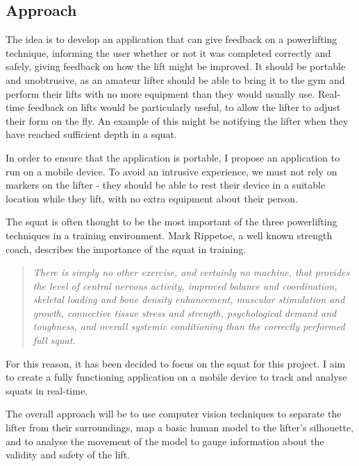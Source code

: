 \subsection{Approach}

The idea is to develop an application that can give feedback on a powerlifting technique, informing the user whether or not it was completed correctly and safely, giving feedback on how the lift might be improved. It should be portable and unobtrusive, as an amateur lifter should be able to bring it to the gym and perform their lifts with no more equipment than they would usually use. Real-time feedback on lifts would be particularly useful, to allow the lifter to adjust their form on the fly. An example of this might be notifying the lifter when they have reached sufficient depth in a squat.

In order to ensure that the application is portable, I propose an application to run on a mobile device. To avoid an intrusive experience, we must not rely on markers on the lifter - they should be able to rest their device in a suitable location while they lift, with no extra equipment about their person.

The squat is often thought to be the most important of the three powerlifting techniques in a training environment. Mark Rippetoe, a well known strength coach, describes the importance of the squat in training.

\begin{quote}
\emph{There is simply no other exercise, and certainly no machine, that provides the level of central nervous activity, improved balance and coordination, skeletal loading and bone density enhancement, muscular stimulation and growth, connective tissue stress and strength, psychological demand and toughness, and overall systemic conditioning than the correctly performed full squat.}
\end{quote}

For this reason, it has been decided to focus on the squat for this project. I aim to create a fully functioning application on a mobile device to track and analyse squats in real-time.

The overall approach will be to use computer vision techniques to separate the lifter from their surroundings, map a basic human model to the lifter's silhouette, and to analyse the movement of the model to gauge information about the validity and safety of the lift.

